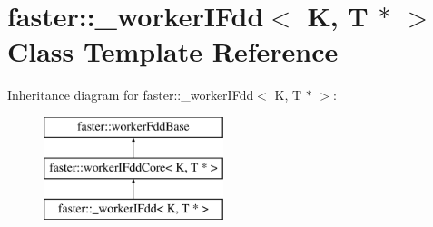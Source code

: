 \hypertarget{classfaster_1_1__workerIFdd_3_01K_00_01T_01_5_01_4}{}\section{faster\+:\+:\+\_\+worker\+I\+Fdd$<$ K, T $\ast$ $>$ Class Template Reference}
\label{classfaster_1_1__workerIFdd_3_01K_00_01T_01_5_01_4}
Inheritance diagram for faster\+:\+:\+\_\+worker\+I\+Fdd$<$ K, T $\ast$ $>$\+:\begin{figure}[H]
\begin{center}
\leavevmode
\includegraphics[height=3.000000cm]{classfaster_1_1__workerIFdd_3_01K_00_01T_01_5_01_4}
\end{center}
\end{figure}
